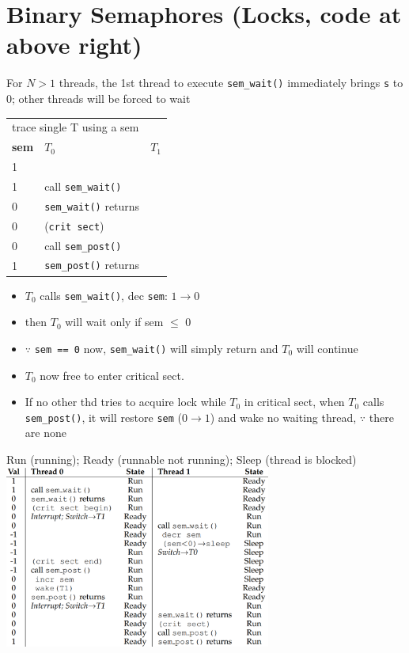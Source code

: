 \section*{Binary Semaphores (Locks, code at above right)}
For $N > 1$ threads, the 1st thread to execute \texttt{sem\_wait()}
immediately brings \texttt{s} to 0; other threads will be forced to wait\\
\begin{minipage}{.48\linewidth}
\begin{tabular}[th]{lll}
  \hline
  \multicolumn{3}{l}{trace single T using a sem}\\
  \textbf{sem} & $T_0$ & $T_1$\\
  \hline
  1 & & \\
  1 & call \texttt{sem\_wait()} & \\
  0 & \texttt{sem\_wait()} returns & \\
  0 & (\texttt{crit sect}) & \\
  0 & call \texttt{sem\_post()} & \\
  1 & \texttt{sem\_post()} returns\\
  \hline
\end{tabular}
\end{minipage}
\begin{minipage}{.52\linewidth}
  \flushleft
  \begin{itemize}
  \item $T_0$ calls \texttt{sem\_wait()}, dec \texttt{sem}: $1 \to 0$
  \item then $T_0$ will wait only if sem $\leq$ 0
  \item $\because$ \texttt{sem == 0} now, \texttt{sem\_wait()} will simply return and $T_0$ will continue
  \item $T_0$ now free to enter critical sect.
  \item If no other thd tries to acquire lock while $T_0$ in critical sect, when $T_0$ calls \texttt{sem\_post()}, it will restore \texttt{sem} ($0 \to 1$) and wake no waiting thread, $\because$ there are none
  \end{itemize}
\end{minipage}
Run (running); Ready (runnable not running); Sleep (thread is blocked)
\includegraphics[width=\linewidth,height=6cm]{imgs/twots_usesem2}
